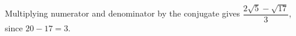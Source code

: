 Multiplying numerator and denominator by the conjugate gives $\boxed{\dfrac{2\sqrt5-\sqrt{17}}{3}}$, since $ 20-17=3 $.
